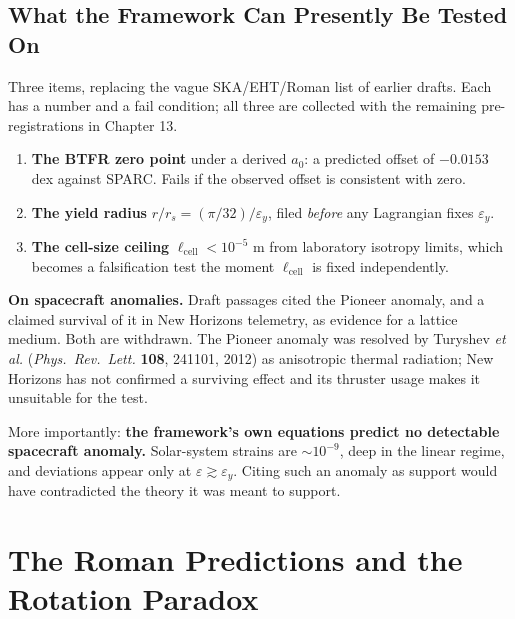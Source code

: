 \documentclass[11pt, letterpaper, openany]{book}
\begin{document}
\section{What the Framework Can Presently Be Tested On}

Three items, replacing the vague SKA/EHT/Roman list of earlier drafts. Each has a number and a fail
condition; all three are collected with the remaining pre-registrations in Chapter 13.

\begin{enumerate}
  \item \textbf{The BTFR zero point} under a derived $a_0$: a predicted offset of
        $\mathbf{-0.0153}$ dex against SPARC. Fails if the observed offset is consistent with zero.
  \item \textbf{The yield radius} $r/r_s = (\pi/32)/\varepsilon_y$, filed \emph{before} any
        Lagrangian fixes $\varepsilon_y$.
  \item \textbf{The cell-size ceiling} $\ell_{\mathrm{cell}} < 10^{-5}$ m from laboratory isotropy
        limits, which becomes a falsification test the moment $\ell_{\mathrm{cell}}$ is fixed
        independently.
\end{enumerate}

\begin{warningbox}
\textbf{On spacecraft anomalies.} Draft passages cited the Pioneer anomaly, and a claimed survival of
it in New Horizons telemetry, as evidence for a lattice medium. Both are withdrawn. The Pioneer
anomaly was resolved by Turyshev \textit{et al.} (\textit{Phys.\ Rev.\ Lett.} \textbf{108}, 241101,
2012) as anisotropic thermal radiation; New Horizons has not confirmed a surviving effect and its
thruster usage makes it unsuitable for the test.

\medskip
More importantly: \textbf{the framework's own equations predict no detectable spacecraft anomaly.}
Solar-system strains are $\sim 10^{-9}$, deep in the linear regime, and deviations appear only at
$\varepsilon \gtrsim \varepsilon_y$. Citing such an anomaly as support would have contradicted the
theory it was meant to support.
\end{warningbox}

\chapter{The Roman Predictions and the Rotation Paradox}
\end{document}
